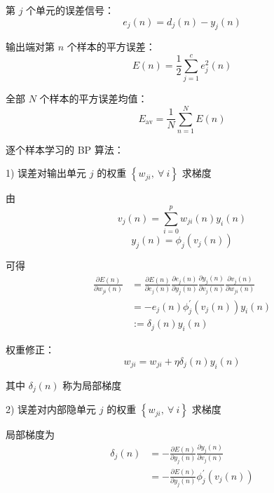 \documentclass[openany]{ctexbook}
\theoremstyle{kaiti}
\theoremstyle{normal}
\begin{document}
第 $j$ 个单元的误差信号：
\begin{equation}
  e_j\left(n \right)=d_j\left(n \right)-y_j\left(n \right)
\end{equation}

输出端对第 $n$ 个样本的平方误差：
\begin{equation}
  E\left(n \right)=\frac{1}{2}\sum_{j=1}^{c}e_{j}^{2}\left(n \right)
\end{equation}

全部 $N$ 个样本的平方误差均值：
\begin{equation}
  E_{\mathrm{av}}=\frac{1}{N}\sum_{n=1}^{N}E\left(n \right)
\end{equation}

逐个样本学习的 BP 算法：

1) 误差对输出单元 $j$ 的权重 $\left\{ w_{ji},~\forall~i \right\}$ 求梯度

由
\begin{equation}
  v_j\left(n \right)=\sum_{i=0}^{p}w_{ji}\left(n \right)y_i\left(n \right)
\end{equation}
\begin{equation}
  y_j\left(n \right)=\phi_j\left(v_j\left(n \right)\right)
\end{equation}

可得
\begin{equation}
  \begin{aligned}
    \frac{\partial E\left(n \right)}{\partial w_{ji}\left(n \right)}
    &=\frac{\partial E\left(n \right)}{\partial e_j\left(n \right)}\frac{\partial e_j\left(n \right)}{\partial y_j\left(n \right)}\frac{\partial y_j\left(n \right)}{\partial v_j\left(n \right)}\frac{\partial v_j\left(n \right)}{\partial w_{ji}\left(n \right)}\\
    &=-e_j\left(n \right)\phi_{j}^{'}\left(v_j\left(n \right)\right)y_i\left(n \right)\\
    &:=\delta_j\left(n \right)y_i\left(n \right)
  \end{aligned}
\end{equation}

权重修正：
\begin{equation}
  w_{ji}=w_{ji}+\eta \delta_j\left(n \right)y_i\left(n \right)
\end{equation}

其中 $\delta_j\left(n \right)$ 称为局部梯度

2) 误差对内部隐单元 $j$ 的权重 $\left\{ w_{ji},~\forall~i \right\}$ 求梯度

局部梯度为
\begin{equation}
  \begin{aligned}
    \delta_j\left(n \right)
    &=-\frac{\partial E\left(n \right)}{\partial y_j\left(n \right)}\frac{\partial y_j\left(n \right)}{\partial v_j\left(n \right)}\\
    &=-\frac{\partial E\left(n \right)}{\partial y_j\left(n \right)}\phi_{j}^{'}\left(v_j\left(n \right)\right)
  \end{aligned}
\end{equation}
\end{document}
